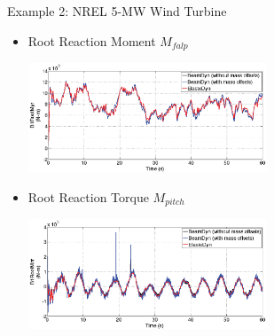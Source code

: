 \documentclass[xcolor=cmyk]{beamer}
\begin{document}
\begin{frame}{Example 2: NREL 5-MW Wind Turbine}
    \begin{itemize}
        \item
        Root Reaction Moment $M_{falp}$
         \begin{center}
         \includegraphics[width=2.8in]{EPSF/B1RootMyr.eps}
         \end{center}
         \item
         Root Reaction Torque $M_{pitch}$
         \begin{center}
         \includegraphics[width=2.8in]{EPSF/B1RootMzr.eps}
         \end{center}
    \end{itemize}
\end{frame}
\end{document}
